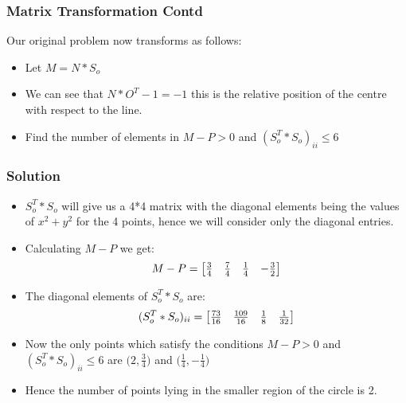 \documentclass{beamer}
\begin{document}
\begin{frame}
\frametitle{Matrix Transformation Contd}
Our original problem now transforms as follows:
\begin{itemize}
 \item<1-> Let $M = N*S_o$ 
 \item<2-> We can see that $N*O^{T} - 1 = -1$ this is the relative position of the centre with respect to the line.
 \item<3-> Find the number of elements in $M-P > 0$ and $(S_o^{T}*S_o)_{ii}\leqslant 6$
\end{itemize}

\end{frame}

\begin{frame}
\frametitle{Solution}
\begin{itemize}
 \item<1-> $S_o^{T}*S_o$ will give us a 4*4 matrix with the diagonal elements being the values of $x^{2} + y^{2}$ for the 4 points, hence we will consider only the diagonal entries. 
 \item<2-> Calculating $M-P$ we get:
 \[
 M-P =
\begin{bmatrix}
    $\(\frac{3}{4}\)$ & $\(\frac{7}{4}\)$ & $\(\frac{1}{4}\)$ & $\(-\frac{3}{2}\)$
\end{bmatrix}
\] 
 \item<3-> The diagonal elements of $S_o^{T}*S_o$ are:
  \[
 (S_o^{T}*S_o)_{ii} =
\begin{bmatrix}
    $\(\frac{73}{16}\)$ & $\(\frac{109}{16}\)$ & $\(\frac{1}{8}\)$ & $\(\frac{1}{32}\)$
\end{bmatrix}
\] 
\item<4-> Now the only points which satisfy the conditions $M-P > 0$ and $(S_o^{T}*S_o)_{ii}\leqslant 6$ are $\bigg(2,$\(\frac{3}{4}\)$\bigg)$ and $\bigg($\(\frac{1}{4}\)$,$\(-\frac{1}{4}\)$\bigg)$
\item<5->Hence the number of points lying in the smaller region of the circle is 2.
\end{itemize}

\end{frame}
\end{document}
